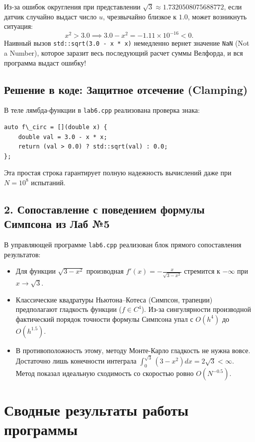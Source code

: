 \documentclass[11pt,a4paper]{article}
\begin{document}
Из-за ошибок округления при представлении $\sqrt{3} \approx 1.7320508075688772$, если датчик случайно выдаст число $u$, чрезвычайно близкое к $1.0$, может возникнуть ситуация:
$$x^2 > 3.0 \implies 3.0 - x^2 = -1.11 \times 10^{-16} < 0.$$
Наивный вызов \texttt{std::sqrt(3.0 - x * x)} немедленно вернет значение \texttt{NaN} (Not a Number), которое заразит весь последующий расчет суммы Велфорда, и вся программа выдаст ошибку!

\subsection{Решение в коде: Защитное отсечение (Clamping)}
В теле лямбда-функции в \texttt{lab6.cpp} реализована проверка знака:
\begin{lstlisting}
auto f\_circ = [](double x) {
    double val = 3.0 - x * x;
    return (val > 0.0) ? std::sqrt(val) : 0.0;
};
\end{lstlisting}
Эта простая строка гарантирует полную надежность вычислений даже при $N = 10^8$ испытаний.

\subsection{2. Сопоставление с поведением формулы Симпсона из Лаб №5}
В управляющей программе \texttt{lab6.cpp} реализован блок прямого сопоставления результатов:
\begin{itemize}
    \item Для функции $\sqrt{3 - x^2}$ производная $f'(x) = -\frac{x}{\sqrt{3 - x^2}}$ стремится к $-\infty$ при $x \to \sqrt{3}$.
    \item Классические квадратуры Ньютона--Котеса (Симпсон, трапеции) предполагают гладкость функции ($f \in C^4$). Из-за сингулярности производной фактический порядок точности формулы Симпсона упал с $O(h^4)$ до $O(h^{1.5})$.
    \item В противоположность этому, методу Монте-Карло гладкость не нужна вовсе. Достаточно лишь конечности интеграла $\int_0^{\sqrt{3}} (3 - x^2)dx = 2\sqrt{3} < \infty$. Метод показал идеальную сходимость со скоростью ровно $O(N^{-0.5})$.
\end{itemize}

\newpage

\section{Сводные результаты работы программы}
\end{document}
